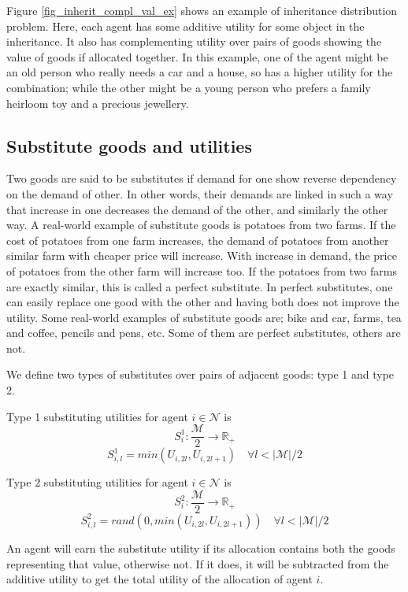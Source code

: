Figure \ref{fig_inherit_compl_val_ex} shows an example of inheritance distribution problem. Here, each agent has some additive utility for some object in the inheritance. It also has complementing utility over pairs of goods showing the value of goods if allocated together. In this example, one of the agent might be an old person who really needs a car and a house, so has a higher utility for the combination; while the other might be a young person who prefers a family heirloom toy and a precious jewellery.

\subsection{Substitute goods and utilities}
\label{section_substitute}

Two goods are said to be substitutes if demand for one show reverse dependency on the demand of other. In other words, their demands are linked in such a way that increase in one decreases the demand of the other, and similarly the other way. A real-world example of substitute goods is potatoes from two farms. If the cost of potatoes from one farm increases, the demand of potatoes from another similar farm with cheaper price will increase. With increase in demand, the price of potatoes from the other farm will increase too. If the potatoes from two farms are exactly similar, this is called a perfect substitute. In perfect substitutes, one can easily replace one good with the other and having both does not improve the utility. Some real-world examples of substitute goods are; bike and car, farms, tea and coffee, pencils and pens, etc. Some of them are perfect substitutes, others are not.

We define two types of substitutes over pairs of adjacent goods: type 1 and type 2.

Type 1 substituting utilities for agent $i \in \mathcal{N}$ is
\[
    S^1_i:  \frac{\mathcal{M}}{2} \rightarrow \mathbb{R_+}
\]
\[
    S^1_{i,l} = min(U_{i,2l}, U_{i, 2l+1}) \quad \forall l < |\mathcal{M}|/2
\]

Type 2 substituting utilities for agent $i \in \mathcal{N}$ is
\[
    S^2_i:  \frac{\mathcal{M}}{2} \rightarrow \mathbb{R_+}
\]
\[
    S^2_{i,l} = rand(0, min(U_{i,2l}, U_{i,2l+1})) \quad \forall l < |\mathcal{M}|/2
\]

An agent will earn the substitute utility if its allocation contains both the goods representing that value, otherwise not. If it does, it will be subtracted from the additive utility to get the total utility of the allocation of agent $i$.

